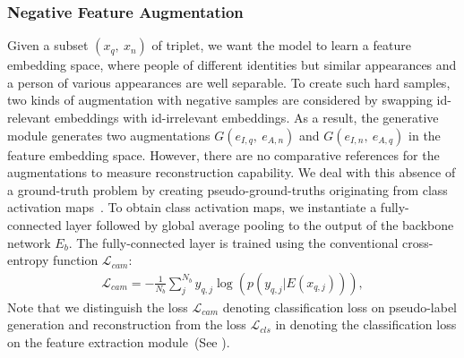 \subsubsection{Negative Feature Augmentation}
Given a subset $\left( x_{\scriptscriptstyle q}, \: x_{\scriptscriptstyle n}\right)$ of triplet, we want the model to learn a feature embedding space, where people of different identities but similar appearances and a person of various appearances are well separable. To create such hard samples, two kinds of augmentation with negative samples are considered by swapping id-relevant embeddings with id-irrelevant embeddings. 
As a result, the generative module generates two augmentations $G\left( e_{\scriptscriptstyle I, q},\: e_{\scriptscriptstyle A, n} \right)$ and $G\left( e_{\scriptscriptstyle I, n},\: e_{\scriptscriptstyle A, q} \right)$ in the feature embedding space. However, there are no comparative references for the augmentations to measure reconstruction capability. We deal with this absence of a ground-truth problem by creating pseudo-ground-truths originating from class activation maps~\cite{zhou2016learning}. To obtain class activation maps, we instantiate a fully-connected layer followed by global average pooling to the output of the backbone network $E_{b}$. The fully-connected layer is trained using the conventional cross-entropy function $\mathcal{L}_{cam}$:
\begin{align}\label{eq:cam_loss}
    \mathcal{L}_{cam} = -\frac{1}{N_b}\sum\limits_{j}^{N_b} y_{\scriptscriptstyle q, j} \log\left( p\left( y_{\scriptscriptstyle q, j} | E(x_{\scriptscriptstyle q, j}) \right)\right), 
\end{align}
Note that we distinguish the loss $\mathcal{L}_{cam}$ denoting classification loss on pseudo-label generation and reconstruction from the loss $\mathcal{L}_{cls}$ in  denoting the classification loss on the feature extraction module~(See ). 

